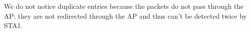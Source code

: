 We do not notice duplicate entries because the packets do not pass through the AP: they are not redirected through the AP and thus can't be detected twice by STA1.
